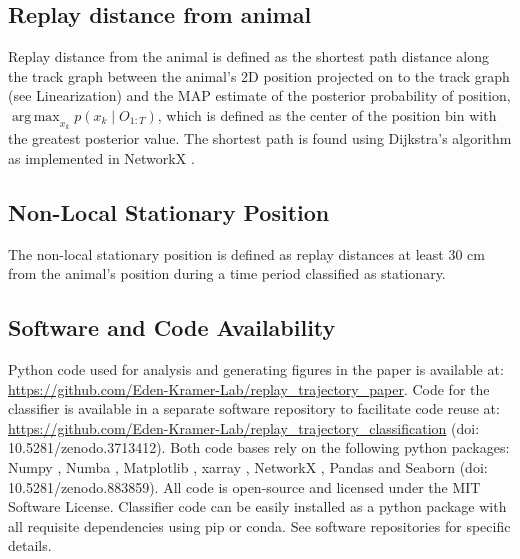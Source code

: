\documentclass[times, twoside]{zHenriquesLab-StyleBioRxiv}
\DeclareMathOperator*{\argmax}{arg\,max}
\begin{document}
\subsection*{Replay distance from animal}
Replay distance from the animal is defined as the shortest path distance along the track graph between the animal's 2D position projected on to the track graph (see Linearization) and the MAP estimate of the posterior probability of position, $\argmax_{x_k} p(x_{k} \mid O_{1:T})$, which is defined as the center of the position bin with the greatest posterior value. The shortest path is found using Dijkstra's algorithm \cite{Dijkstranotetwoproblems1959} as implemented in NetworkX \cite{HagbergExploringNetworkStructure2008}.

\subsection*{Non-Local Stationary Position}
The non-local stationary position is defined as replay distances at least 30 cm from the animal's position during a time period classified as stationary.

\subsection*{Software and Code Availability}
Python code used for analysis and generating figures in the paper is available at: \url{https://github.com/Eden-Kramer-Lab/replay_trajectory_paper}. Code for the classifier is available in a separate software repository to facilitate code reuse at: \url{https://github.com/Eden-Kramer-Lab/replay_trajectory_classification} (doi: 10.5281/zenodo.3713412).
Both code bases rely on the following python packages: Numpy \cite{vanderWaltNumPyArrayStructure2011}, Numba \cite{LamNumbaLLVMbasedPython2015}, Matplotlib \cite{HunterMatplotlib2DGraphics2007}, xarray \cite{HoyerxarrayNDlabeled2017}, NetworkX \cite{HagbergExploringNetworkStructure2008}, Pandas \cite{McKinneyDataStructuresStatistical2010} and Seaborn (doi: 10.5281/zenodo.883859). All code is open-source and licensed under the MIT Software License. Classifier code can be easily installed as a python package with all requisite dependencies using pip or conda. See software repositories for specific details.

\newpage

\beginsupplement
\captionsetup*{format=largeformat}
\end{document}
